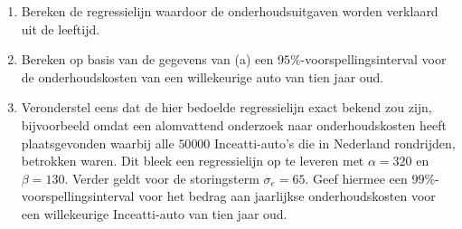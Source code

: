 \begin{enumerate}[label=(\alph*)]
    \item Bereken de regressielijn waardoor de onderhoudsuitgaven worden verklaard uit de leeftijd.
    \answer{

    }

    \item Bereken op basis van de gegevens van (a) een $95\%$-voorspellingsinterval voor de onderhoudskosten van een willekeurige auto van tien jaar oud.
    \answer{

    }

    \item Veronderstel eens dat de hier bedoelde regressielijn exact bekend zou zijn, bijvoorbeeld omdat een alomvattend onderzoek naar onderhoudskosten heeft plaatsgevonden waarbij alle $50 000$ Inceatti-auto's die in Nederland rondrijden, betrokken waren.
    Dit bleek een regressielijn op te leveren met $\alpha=320$ en $\beta=130$.
    Verder geldt voor de storingsterm $\sigma_e = 65$.
    Geef hiermee een $99\%$-voorspellingsinterval voor het bedrag aan jaarlijkse onderhoudskosten voor een willekeurige Inceatti-auto van tien jaar oud.
    \answer{
    
    }
\end{enumerate}